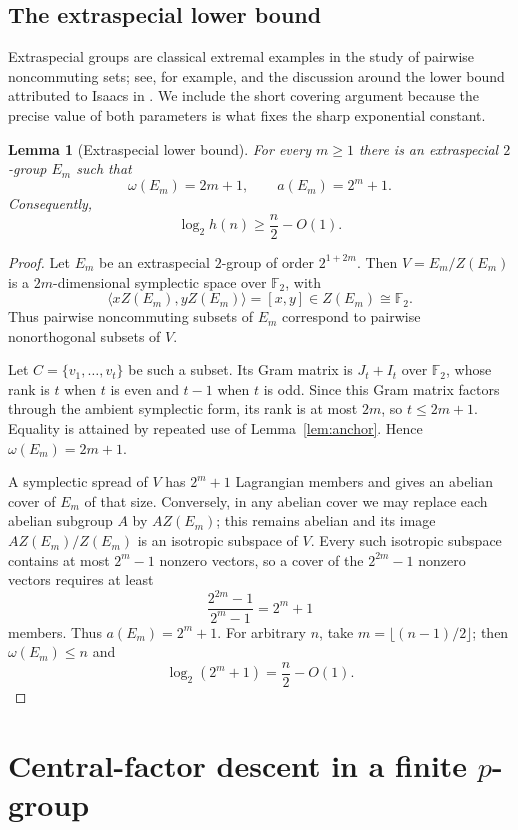 \documentclass[11pt]{article}
\newtheorem{lemma}[theorem]{Lemma}
\theoremstyle{definition}
\theoremstyle{remark}
\newcommand{\F}{\mathbb{F}}
\begin{document}
\subsection{The extraspecial lower bound}

Extraspecial groups are classical extremal examples in the study of pairwise noncommuting sets; see, for example, \cite{Chin2005} and the discussion around the lower bound attributed to Isaacs in \cite{Erdos1997,Pyber1987}. We include the short covering argument because the precise value of both parameters is what fixes the sharp exponential constant.

\begin{lemma}[Extraspecial lower bound]\label{lem:extraspecial}
For every $m\ge1$ there is an extraspecial $2$-group $E_m$ such that
\[
\omega(E_m)=2m+1,\qquad a(E_m)=2^m+1.
\]
Consequently,
\[
\log_2 h(n)\ge\frac n2-O(1).
\]
\end{lemma}

\begin{proof}
Let $E_m$ be an extraspecial $2$-group of order $2^{1+2m}$. Then $V=E_m/Z(E_m)$ is a $2m$-dimensional symplectic space over $\F_2$, with
\[
\langle xZ(E_m),yZ(E_m)\rangle=[x,y]\in Z(E_m)\cong\F_2.
\]
Thus pairwise noncommuting subsets of $E_m$ correspond to pairwise nonorthogonal subsets of $V$.

Let $C=\{v_1,\ldots,v_t\}$ be such a subset. Its Gram matrix is $J_t+I_t$ over $\F_2$, whose rank is $t$ when $t$ is even and $t-1$ when $t$ is odd. Since this Gram matrix factors through the ambient symplectic form, its rank is at most $2m$, so $t\le2m+1$. Equality is attained by repeated use of Lemma~\ref{lem:anchor}. Hence $\omega(E_m)=2m+1$.

A symplectic spread of $V$ has $2^m+1$ Lagrangian members and gives an abelian cover of $E_m$ of that size. Conversely, in any abelian cover we may replace each abelian subgroup $A$ by $AZ(E_m)$; this remains abelian and its image $AZ(E_m)/Z(E_m)$ is an isotropic subspace of $V$. Every such isotropic subspace contains at most $2^m-1$ nonzero vectors, so a cover of the $2^{2m}-1$ nonzero vectors requires at least
\[
\frac{2^{2m}-1}{2^m-1}=2^m+1
\]
members. Thus $a(E_m)=2^m+1$. For arbitrary $n$, take $m=\lfloor(n-1)/2\rfloor$; then $\omega(E_m)\le n$ and
\[
\log_2(2^m+1)=\frac n2-O(1).
\]
\end{proof}

\section{Central-factor descent in a finite \texorpdfstring{$p$}{p}-group}
\end{document}
